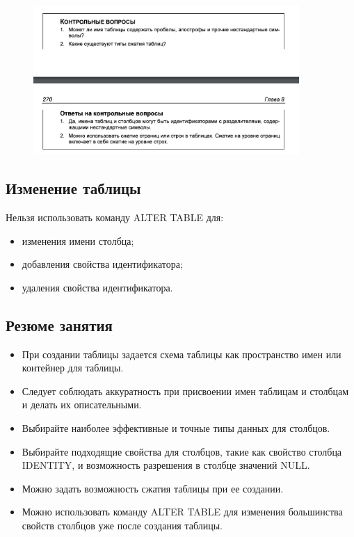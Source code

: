 \begin{figure}[h!]
	\begin{center}
		\includegraphics[width=0.9\textwidth]{img/control17.png}
	\end{center}
	\captionsetup{justification=centering}
\end{figure}


\subsection{Изменение таблицы}

Нельзя использовать команду ALTER TABLE для: 
\begin{itemize}
	\item изменения имени столбца; 
	\item добавления свойства идентификатора; 
	\item удаления свойства идентификатора. 
\end{itemize}

\subsection*{Резюме занятия}
\begin{itemize}
	\item При создании таблицы задается схема таблицы как пространство имен или контейнер для таблицы. 
	\item Следует соблюдать аккуратность при присвоении имен таблицам и столбцам и
	делать их описательными. 
	\item Выбирайте наиболее эффективные и точные типы данных для столбцов. 
	\item  Выбирайте подходящие свойства для столбцов, такие как свойство столбца
	IDENTITY, и возможность разрешения в столбце значений NULL. 
	\item Можно задать возможность сжатия таблицы при ее создании. 
	\item Можно использовать команду ALTER TABLE для изменения большинства свойств
	столбцов уже после создания таблицы. 
\end{itemize}

